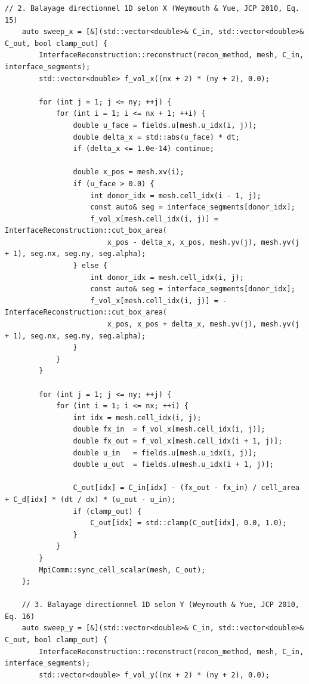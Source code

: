 \documentclass[10pt,a4paper,oneside]{book}
\begin{document}
\begin{lstlisting}[language={[11]C++}]
    // 2. Balayage directionnel 1D selon X (Weymouth & Yue, JCP 2010, Eq. 15)
    auto sweep_x = [&](std::vector<double>& C_in, std::vector<double>& C_out, bool clamp_out) {
        InterfaceReconstruction::reconstruct(recon_method, mesh, C_in, interface_segments);
        std::vector<double> f_vol_x((nx + 2) * (ny + 2), 0.0);

        for (int j = 1; j <= ny; ++j) {
            for (int i = 1; i <= nx + 1; ++i) {
                double u_face = fields.u[mesh.u_idx(i, j)];
                double delta_x = std::abs(u_face) * dt;
                if (delta_x <= 1.0e-14) continue;

                double x_pos = mesh.xv(i);
                if (u_face > 0.0) {
                    int donor_idx = mesh.cell_idx(i - 1, j);
                    const auto& seg = interface_segments[donor_idx];
                    f_vol_x[mesh.cell_idx(i, j)] = InterfaceReconstruction::cut_box_area(
                        x_pos - delta_x, x_pos, mesh.yv(j), mesh.yv(j + 1), seg.nx, seg.ny, seg.alpha);
                } else {
                    int donor_idx = mesh.cell_idx(i, j);
                    const auto& seg = interface_segments[donor_idx];
                    f_vol_x[mesh.cell_idx(i, j)] = -InterfaceReconstruction::cut_box_area(
                        x_pos, x_pos + delta_x, mesh.yv(j), mesh.yv(j + 1), seg.nx, seg.ny, seg.alpha);
                }
            }
        }

        for (int j = 1; j <= ny; ++j) {
            for (int i = 1; i <= nx; ++i) {
                int idx = mesh.cell_idx(i, j);
                double fx_in  = f_vol_x[mesh.cell_idx(i, j)];
                double fx_out = f_vol_x[mesh.cell_idx(i + 1, j)];
                double u_in   = fields.u[mesh.u_idx(i, j)];
                double u_out  = fields.u[mesh.u_idx(i + 1, j)];

                C_out[idx] = C_in[idx] - (fx_out - fx_in) / cell_area + C_d[idx] * (dt / dx) * (u_out - u_in);
                if (clamp_out) {
                    C_out[idx] = std::clamp(C_out[idx], 0.0, 1.0);
                }
            }
        }
        MpiComm::sync_cell_scalar(mesh, C_out);
    };

    // 3. Balayage directionnel 1D selon Y (Weymouth & Yue, JCP 2010, Eq. 16)
    auto sweep_y = [&](std::vector<double>& C_in, std::vector<double>& C_out, bool clamp_out) {
        InterfaceReconstruction::reconstruct(recon_method, mesh, C_in, interface_segments);
        std::vector<double> f_vol_y((nx + 2) * (ny + 2), 0.0);


\end{lstlisting}
\end{document}
